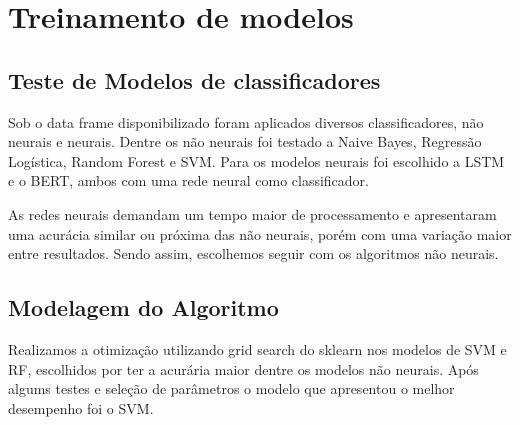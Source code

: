 \section{Treinamento de modelos}
\label{sec:model_training}

\subsection{Teste de Modelos de classificadores}

Sob o data frame disponibilizado foram aplicados diversos classificadores, não neurais e neurais. Dentre os não neurais foi testado a Naive Bayes, Regressão Logística, Random Forest e SVM. Para os modelos neurais foi escolhido a LSTM e o BERT, ambos com uma rede neural como classificador.

As redes neurais demandam um tempo maior de processamento e apresentaram uma acurácia similar ou próxima das não neurais, porém com uma variação maior entre resultados. Sendo assim, escolhemos seguir com os algoritmos não neurais.


\subsection{Modelagem do Algoritmo}

Realizamos a otimização utilizando grid search do sklearn nos modelos de SVM e RF, escolhidos por ter a acurária maior dentre os modelos não neurais. Após algums testes e seleção de parâmetros o modelo que apresentou o melhor desempenho foi o SVM.

